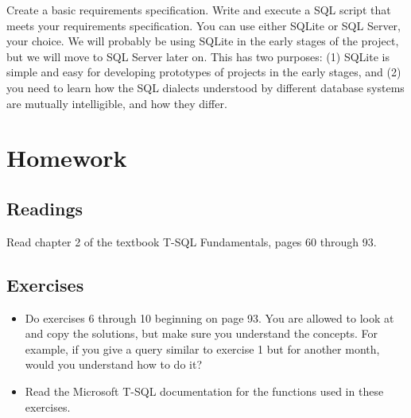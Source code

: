 \documentclass{article}
\begin{document}
        Create a basic requirements specification. Write and execute a SQL script that meets your requirements specification. You can use either SQLite or SQL Server, your choice. We will probably be using SQLite in the early stages of the project, but we will move to SQL Server later on. This has two purposes: (1) SQLite is simple and easy for developing prototypes of projects in the early stages, and (2) you need to learn how the SQL dialects understood by different database systems are mutually intelligible, and how they differ.

    \section{Homework}


        \subsection{Readings}
         Read chapter 2 of the textbook T-SQL Fundamentals, pages 60 through 93.

        
        \subsection{Exercises}

        \begin{itemize}
        \item Do exercises 6 through 10 beginning on page 93. You are allowed to look at and copy the solutions, but make sure you understand the concepts. For example, if you give a query similar to exercise 1 but for another month, would you understand how to do it?

        \item Read the Microsoft T-SQL documentation for the functions used in these exercises.
        \end{itemize}
\end{document}
